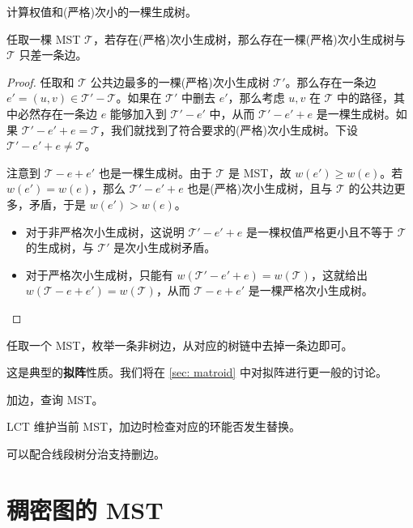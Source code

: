 \begin{example}[(严格)次小生成树]
    计算权值和(严格)次小的一棵生成树。
\end{example}
\begin{lemma}
    任取一棵 MST $\mathcal T$，若存在(严格)次小生成树，那么存在一棵(严格)次小生成树与 $\mathcal T$ 只差一条边。
\end{lemma}
\begin{proof}
    任取和 $\mathcal T$ 公共边最多的一棵(严格)次小生成树 $\mathcal T'$。那么存在一条边 $e'=(u,v)\in \mathcal T'-\mathcal T$。如果在 $\mathcal T'$ 中删去 $e'$，那么考虑 $u,v$ 在 $\mathcal T$ 中的路径，其中必然存在一条边 $e$ 能够加入到 $\mathcal T'-e'$ 中，从而 $\mathcal T'-e'+e$ 是一棵生成树。如果 $\mathcal T'-e'+e=\mathcal T$，我们就找到了符合要求的(严格)次小生成树。下设 $\mathcal T'-e'+e\ne \mathcal T$。
    
    注意到 $\mathcal T-e+e'$ 也是一棵生成树。由于 $\mathcal T$ 是 MST，故 $w(e')\ge w(e)$。若 $w(e')=w(e)$，那么 $\mathcal T'-e'+e$ 也是(严格)次小生成树，且与 $\mathcal T$ 的公共边更多，矛盾，于是 $w(e')>w(e)$。
    \begin{itemize}
        \item 对于非严格次小生成树，这说明 $\mathcal T'-e'+e$ 是一棵权值严格更小且不等于 $\mathcal T$ 的生成树，与 $\mathcal T'$ 是次小生成树矛盾。
        \item 对于严格次小生成树，只能有 $w(\mathcal T'-e'+e)=w(\mathcal T)$，这就给出 $w(\mathcal T-e+e')=w(\mathcal T)$，从而 $\mathcal T-e+e'$ 是一棵严格次小生成树。
    \end{itemize}
\end{proof}
\begin{solution}
    任取一个 MST，枚举一条非树边，从对应的树链中去掉一条边即可。    
\end{solution}
\begin{remark}
    这是典型的\textbf{拟阵}性质。我们将在 \cref{sec: matroid} 中对拟阵进行更一般的讨论。
\end{remark}

\begin{example}[增量 MST]
    加边，查询 MST。
\end{example}
\begin{solution}
    LCT 维护当前 MST，加边时检查对应的环能否发生替换。
\end{solution}
\begin{remark}
    可以配合线段树分治支持删边。
\end{remark}

\section{稠密图的 MST}

